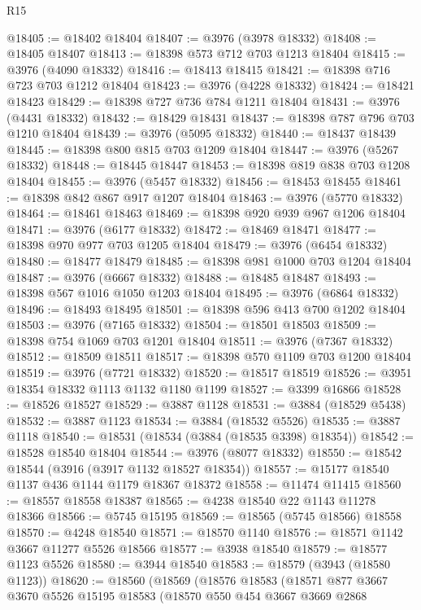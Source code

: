 \begin{lexlean}{R15}
\begin{coremodule}
@18405 := @18402 @18404
@18407 := @3976 (@3978 @18332)
@18408 := @18405 @18407
@18413 := @18398 @573 @712 @703 @1213 @18404
@18415 := @3976 (@4090 @18332)
@18416 := @18413 @18415
@18421 := @18398 @716 @723 @703 @1212 @18404
@18423 := @3976 (@4228 @18332)
@18424 := @18421 @18423
@18429 := @18398 @727 @736 @784 @1211 @18404
@18431 := @3976 (@4431 @18332)
@18432 := @18429 @18431
@18437 := @18398 @787 @796 @703 @1210 @18404
@18439 := @3976 (@5095 @18332)
@18440 := @18437 @18439
@18445 := @18398 @800 @815 @703 @1209 @18404
@18447 := @3976 (@5267 @18332)
@18448 := @18445 @18447
@18453 := @18398 @819 @838 @703 @1208 @18404
@18455 := @3976 (@5457 @18332)
@18456 := @18453 @18455
@18461 := @18398 @842 @867 @917 @1207 @18404
@18463 := @3976 (@5770 @18332)
@18464 := @18461 @18463
@18469 := @18398 @920 @939 @967 @1206 @18404
@18471 := @3976 (@6177 @18332)
@18472 := @18469 @18471
@18477 := @18398 @970 @977 @703 @1205 @18404
@18479 := @3976 (@6454 @18332)
@18480 := @18477 @18479
@18485 := @18398 @981 @1000 @703 @1204 @18404
@18487 := @3976 (@6667 @18332)
@18488 := @18485 @18487
@18493 := @18398 @567 @1016 @1050 @1203 @18404
@18495 := @3976 (@6864 @18332)
@18496 := @18493 @18495
@18501 := @18398 @596 @413 @700 @1202 @18404
@18503 := @3976 (@7165 @18332)
@18504 := @18501 @18503
@18509 := @18398 @754 @1069 @703 @1201 @18404
@18511 := @3976 (@7367 @18332)
@18512 := @18509 @18511
@18517 := @18398 @570 @1109 @703 @1200 @18404
@18519 := @3976 (@7721 @18332)
@18520 := @18517 @18519
@18526 := @3951 @18354 @18332 @1113 @1132 @1180 @1199
@18527 := @3399 @16866
@18528 := @18526 @18527
@18529 := @3887 @1128
@18531 := @3884 (@18529 @5438)
@18532 := @3887 @1123
@18534 := @3884 (@18532 @5526)
@18535 := @3887 @1118
@18540 := @18531 (@18534 (@3884 (@18535 @3398) @18354))
@18542 := @18528 @18540 @18404
@18544 := @3976 (@8077 @18332)
@18550 := @18542 @18544 (@3916 (@3917 @1132 @18527 @18354))
@18557 := @15177 @18540 @1137 @436 @1144 @1179 @18367 @18372
@18558 := @11474 @11415
@18560 := @18557 @18558 @18387
@18565 := @4238 @18540 @22 @1143 @11278 @18366
@18566 := @5745 @15195
@18569 := @18565 (@5745 @18566) @18558
@18570 := @4248 @18540
@18571 := @18570 @1140
@18576 := @18571 @1142 @3667 @11277 @5526 @18566
@18577 := @3938 @18540
@18579 := @18577 @1123 @5526
@18580 := @3944 @18540
@18583 := @18579 (@3943 (@18580 @1123))
@18620 := @18560
    (@18569
      (@18576
        @18583
        (@18571
          @877
          @3667
          @3670
          @5526
          @15195
          @18583
          (@18570
            @550
            @454
            @3667
            @3669
            @2868

\end{coremodule}
\end{lexlean}
